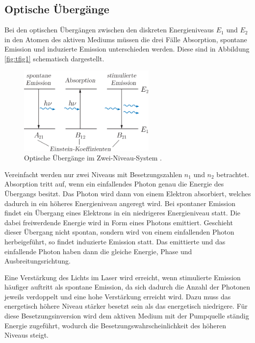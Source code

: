 \subsection*{Optische Übergänge}
Bei den optischen Übergängen zwischen den diskreten Energieniveaus $E_1$ und $E_2$ in den Atomen des aktiven Mediums
müssen die drei Fälle Absorption, spontane Emission und induzierte Emission unterschieden werden. Diese sind in 
Abbildung \ref{fig:tfig1} schematisch dargestellt.
\FloatBarrier
    \begin{figure}[h]
    \centering
    \includegraphics[width=0.6\textwidth]{optisch.png}
    \caption{Optische Übergänge im Zwei-Niveau-System \cite{quelle05}.}
    \label{fig:dfig1}
    \end{figure}
\FloatBarrier
\noindent
Vereinfacht werden nur zwei Niveaus mit Besetzungszahlen $n_1$ und $n_2$ betrachtet. 
Absorption tritt auf, wenn ein einfallendes Photon genau die Energie des Übergangs besitzt. Das Photon wird dann von einem
Elektron absorbiert, welches dadurch in ein höheres Energieniveau angeregt wird.
Bei spontaner Emission findet ein Übergang eines Elektrons in ein niedrigeres Energieniveau statt. Die dabei freiwerdende
Energie wird in Form eines Photons emittiert. Geschieht dieser Übergang nicht spontan, sondern wird von einem einfallenden 
Photon herbeigeführt, so findet induzierte Emission statt. Das emittierte und das einfallende Photon haben dann die gleiche
Energie, Phase und Ausbreitungsrichtung.

Eine Verstärkung des Lichts im Laser wird erreicht, wenn stimulierte Emission häufiger auftritt als spontane Emission, 
da sich dadurch die Anzahl der Photonen jeweils verdoppelt und eine hohe Verstärkung erreicht wird. 
Dazu muss das energetisch höhere Niveau stärker besetzt sein als das energetisch niedrigere. Für diese
Besetzungsinversion wird dem aktiven Medium mit der Pumpquelle ständig Energie zugeführt, wodurch die Besetzungswahrscheinlichkeit
des höheren Niveaus steigt. 

